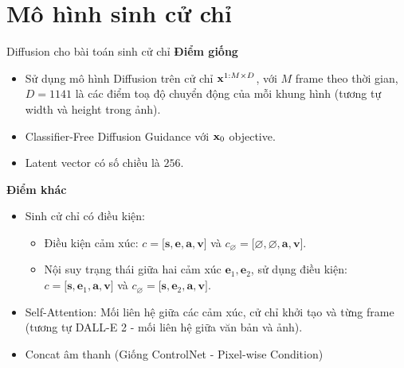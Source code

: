 
\section{Mô hình sinh cử chỉ}

%


\begin{frame}{Diffusion cho bài toán sinh cử chỉ}
	\textbf{Điểm giống}
	\begin{itemize}
		\item Sử dụng mô hình Diffusion \cite{yang2023diffusestylegesture} trên cử chỉ $\mathbf{x}^{1:M \times D}$,  với $M$ frame theo thời gian, $D=1141$ là các điểm toạ độ chuyển động của mỗi khung hình (tương tự width và height trong ảnh).
		\item Classifier-Free Diffusion Guidance với $\mathbf{x}_0$ objective.
		\item Latent vector có số chiều là $256$.
		\end{itemize}
		
		\textbf{Điểm khác}
		
		\begin{itemize}
			\item Sinh cử chỉ có điều kiện:
			\begin{itemize}
				\item Điều kiện cảm xúc: $c = \big[ \mathbf{s}, \mathbf{e}, \mathbf{a}, \mathbf{v} \big]$ và $c_{\varnothing} = \big[ \varnothing, \varnothing, \mathbf{a}, \mathbf{v}\big]$.
				\item Nội suy trạng thái giữa hai cảm xúc $\mathbf{e}_1, \mathbf{e}_2$, sử dụng điều kiện: $c = \big[ \mathbf{s}, \mathbf{e}_1, \mathbf{a}, \mathbf{v} \big]$ và $c_{\varnothing} = \big[ \mathbf{s}, \mathbf{e}_2, \mathbf{a}, \mathbf{v} \big]$.
			\end{itemize}
			\item Self-Attention: Mối liên hệ giữa các cảm xúc, cử chỉ khởi tạo và từng frame (tương tự DALL-E 2 - mối liên hệ giữa văn bản và ảnh).
			\item Concat âm thanh (Giống ControlNet - Pixel-wise Condition)
		\end{itemize}
\end{frame}

